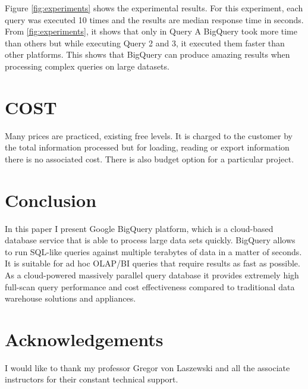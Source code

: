 \documentclass[9pt,twocolumn,twoside]{../../styles/osajnl}
\begin{document}
\noindent
Figure \ref{fig:experiments} shows the experimental results. For this
experiment, each query was executed 10 times and the results are
median response time in seconds. From \ref{fig:experiments}, it shows
that only in Query A BigQuery took more time than others but while
executing Query 2 and 3, it executed them faster than other
platforms. This shows that BigQuery can produce amazing results when
processing complex queries on large datasets.

\section{COST}
Many prices are practiced, existing free levels. It is charged to the
customer by the total information processed but for loading, reading or
export information there is no associated cost.  There is also budget
option for a particular project.

\section{Conclusion}
In this paper I present Google BigQuery platform, which is a
cloud-based database service that is able to process large data sets
quickly. BigQuery allows to run SQL-like queries against multiple
terabytes of data in a matter of seconds. It is suitable for ad hoc
OLAP/BI queries that require results as fast as possible. As a
cloud-powered massively parallel query database it provides extremely
high full-scan query performance and cost effectiveness compared to
traditional data warehouse solutions and appliances.

\section*{Acknowledgements}

I would like to thank my professor Gregor von Laszewski and all the
associate instructors for their constant technical support.



 
\newpage

\appendix
\end{document}

